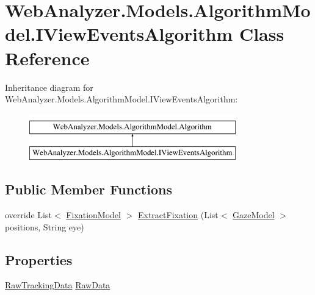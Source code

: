 \hypertarget{class_web_analyzer_1_1_models_1_1_algorithm_model_1_1_i_view_events_algorithm}{}\section{Web\+Analyzer.\+Models.\+Algorithm\+Model.\+I\+View\+Events\+Algorithm Class Reference}
\label{class_web_analyzer_1_1_models_1_1_algorithm_model_1_1_i_view_events_algorithm}
Inheritance diagram for Web\+Analyzer.\+Models.\+Algorithm\+Model.\+I\+View\+Events\+Algorithm\+:\begin{figure}[H]
\begin{center}
\leavevmode
\includegraphics[height=2.000000cm]{class_web_analyzer_1_1_models_1_1_algorithm_model_1_1_i_view_events_algorithm}
\end{center}
\end{figure}
\subsection*{Public Member Functions}
\begin{DoxyCompactItemize}
\item 
override List$<$ \hyperlink{class_web_analyzer_1_1_models_1_1_analysis_model_1_1_fixation_model}{Fixation\+Model} $>$ \hyperlink{class_web_analyzer_1_1_models_1_1_algorithm_model_1_1_i_view_events_algorithm_aff1e838e0f623dbbeb6d856bffbf4b27}{Extract\+Fixation} (List$<$ \hyperlink{class_web_analyzer_1_1_models_1_1_data_model_1_1_gaze_model}{Gaze\+Model} $>$ positions, String eye)
\end{DoxyCompactItemize}
\subsection*{Properties}
\begin{DoxyCompactItemize}
\item 
\hyperlink{class_web_analyzer_1_1_models_1_1_base_1_1_raw_tracking_data}{Raw\+Tracking\+Data} \hyperlink{class_web_analyzer_1_1_models_1_1_algorithm_model_1_1_i_view_events_algorithm_a1fbc48724f9cc7bea3d6ee03d9d533eb}{Raw\+Data}
\end{DoxyCompactItemize}

